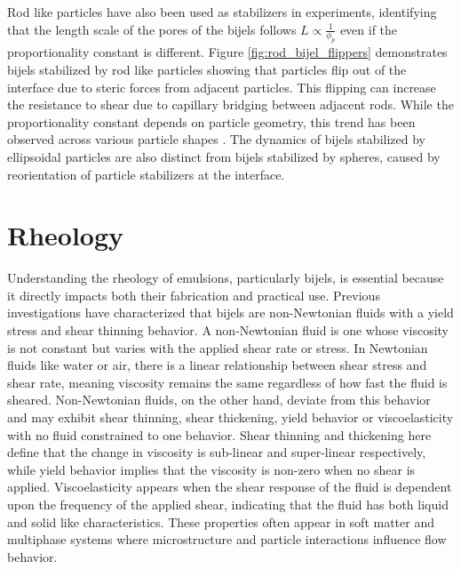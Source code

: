 Rod like particles have also been used as stabilizers in experiments, identifying that the length scale of the pores of the bijels follows $ L \propto \frac{1}{\phi_p} $ even if the proportionality constant 
is different. Figure \ref{fig:rod_bijel_flippers} demonstrates bijels stabilized by rod like particles showing that particles flip out of the interface due to steric forces from adjacent particles. This
flipping can increase the resistance to shear due to capillary bridging between adjacent rods.
While the proportionality constant depends on particle geometry, this trend has been observed across various particle shapes 
\cite{hijnen_bijels_2015, madivala_exploiting_2009, gunther_timescales_2014, daware_emulsions_2015, loudet_capillary_2005, cheng_shape-anisotropic_2013}. 
The dynamics of bijels stabilized by ellipsoidal particles are also distinct from bijels stabilized by spheres, caused by reorientation of particle stabilizers at the interface. \cite{gunther_timescales_2014}

\section{Rheology}

Understanding the rheology of emulsions, particularly bijels, is essential because it directly impacts both their fabrication and practical use. \cite{haase_situ_2016}
Previous investigations have characterized that bijels are non-Newtonian fluids with a yield stress and shear thinning behavior. \cite{macmillan_rheological_2019}
A non-Newtonian fluid is one whose viscosity is not constant but varies with the applied shear rate or stress. In Newtonian fluids like water 
or air, there is a linear relationship between shear stress and shear rate, meaning viscosity remains the same regardless of how fast the fluid is sheared. \cite{mezger_rheology_2020} Non-Newtonian fluids, on 
the other hand, deviate from this behavior and may exhibit shear thinning, shear thickening, yield behavior or viscoelasticity with no fluid constrained to one behavior. \cite{mezger_rheology_2020}
Shear thinning and thickening here define that the change in viscosity is sub-linear and super-linear respectively, while yield behavior implies that the viscosity is non-zero when no shear 
is applied. \cite{mezger_rheology_2020} Viscoelasticity appears when the shear response of the fluid is dependent upon the frequency of the applied shear, indicating that the fluid has both liquid and solid like 
characteristics. \cite{mezger_rheology_2020}
These properties often appear in soft matter and multiphase systems where microstructure and particle interactions influence flow behavior.

